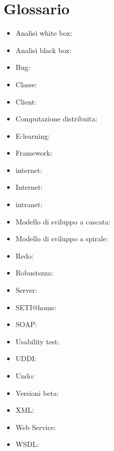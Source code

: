 \chapter*{Glossario}

\begin{itemize}
	\item Analisi white box:
	\item Analisi black box:
	\item Bug:
	\item Classe:
	\item Client:
	\item Computazione distribuita:
	\item E-learning:
	\item Framework:
	\item internet:
	\item Internet:
	\item intranet:
	\item Modello di sviluppo a cascata: 
	\item Modello di sviluppo a spirale: 
	\item Redo:
	\item Robustezza:
	\item Server:
	\item SETI@home:
	\item SOAP:
	\item Usability test:
	\item UDDI:
	\item Undo:
	\item Versioni beta:
	\item XML:
	\item Web Service:
	\item WSDL:
	
\end{itemize}